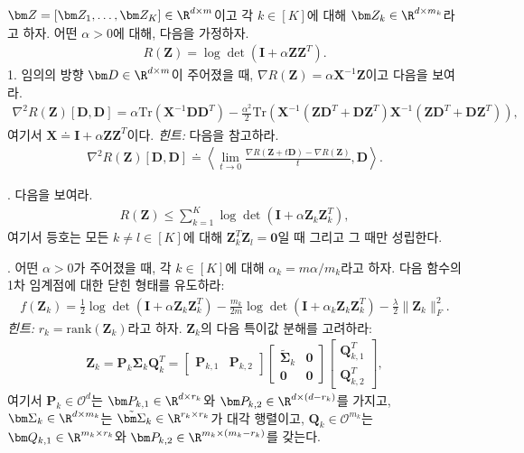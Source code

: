 \documentclass[../../book-main_ko.tex]{subfiles}
\begin{document}
\begin{exercise}
    $\bm Z = [\bm Z_1,\dots,\bm Z_K] \in \R^{d\times m}$이고 각 $k \in [K]$에 대해 $\bm Z_k \in \R^{d\times m_k}$라고 하자. 어떤 $\alpha > 0$에 대해, 다음을 가정하자.
    \begin{align*}
        R(\bm Z) = \log\det\left(\bm I + \alpha\bm Z\bm Z^T \right).
    \end{align*}
1. 임의의 방향 $\bm D \in \R^{d\times m}$이 주어졌을 때, $\nabla R(\bm Z) = \alpha\bm X^{-1}\bm Z$이고 다음을 보여라.
    \begin{align*}
 \nabla^2 R(\bm Z)[\bm D, \bm D] =\alpha \mathrm{Tr}\left( \bm X^{-1}\bm D\bm D^T\right) - \frac{\alpha^2}{2}\mathrm{Tr}\left(\bm X^{-1}\left( \bm Z\bm D^T+\bm D\bm Z^T\right) \bm X^{-1}\left( \bm Z\bm D^T+\bm D\bm Z^T\right)\right),
    \end{align*}
    여기서 $\bm X \doteq \bm I + \alpha\bm Z\bm Z^T$이다. {\em 힌트:} 다음을 참고하라.
    \begin{align*}
        \nabla^2 R(\bm Z)[\bm D, \bm D] \doteq \left\langle \lim_{t \to 0} \frac{\nabla R(\bm Z+ t\bm D) - \nabla R(\bm Z)}{t}, \bm D \right\rangle. 
    \end{align*}

. 다음을 보여라.
\begin{align*}
    R(\bm Z) \le \sum_{k=1}^K \log\det\left(\bm I + \alpha\bm Z_k\bm Z_k^T \right),
\end{align*}
여기서 등호는 모든 $k \neq l \in [K]$에 대해 $\bm Z_k^T\bm Z_l = \bm 0$일 때 그리고 그 때만 성립한다.
\medskip 

. 어떤 $\alpha >0$가 주어졌을 때, 각 $k \in [K]$에 대해 $\alpha_k=m\alpha/m_k$라고 하자. 다음 함수의 1차 임계점에 대한 닫힌 형태를 유도하라:
\begin{align*}
    f(\bm Z_k) = \frac{1}{2}\log\det\left(\bm I + \alpha\bm Z_k\bm Z_k^T \right) - \frac{m_k}{2m}\log\det\left(\bm I + \alpha_k \bm Z_k\bm Z_k^T \right) - \frac{\lambda}{2}\|\bm Z_k\|_F^2. 
\end{align*}
{\em 힌트:} $r_k=\mathrm{rank}(\bm Z_k)$라고 하자. $\bm Z_k$의 다음 특이값 분해를 고려하라:
\begin{align*}
    \bm Z_k = \bm P_k\bm \Sigma_k\bm Q_k^T = \begin{bmatrix}
        \bm P_{k,1} & \bm P_{k,2}
    \end{bmatrix} \begin{bmatrix}
        \tilde{\bm \Sigma}_{k} & \bm 0 \\
        \bm 0 & \bm 0
    \end{bmatrix} 
    \begin{bmatrix}
        \bm Q_{k,1}^T \\ \bm Q_{k,2}^T
    \end{bmatrix}, 
\end{align*}
여기서 $\bm P_k \in \mathcal{O}^d$는 $\bm P_{k,1} \in \R^{d\times r_k}$와 $\bm P_{k,2} \in \R^{d\times (d-r_k)}$를 가지고, $\bm \Sigma_k \in \R^{d\times m_k}$는 $\tilde{\bm \Sigma}_{k} \in \R^{r_k\times r_k}$가 대각 행렬이고, $\bm Q_k \in \mathcal{O}^{m_k}$는 $\bm Q_{k,1} \in \R^{m_k\times r_k}$와 $\bm P_{k,2} \in \R^{m_k \times (m_k-r_k)}$를 갖는다.
\medskip 


\end{exercise}
\end{document}
